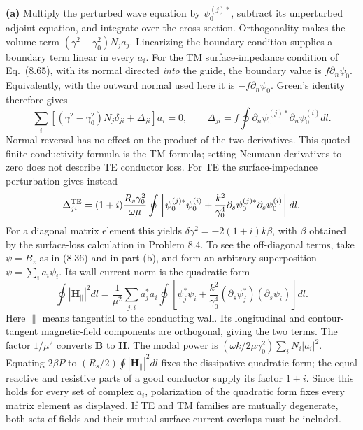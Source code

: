 \textbf{(a)} Multiply the perturbed wave equation by
$\psi_0^{(j)*}$, subtract its unperturbed adjoint equation, and
integrate over the cross section.  Orthogonality makes the volume
term $(\gamma^2-\gamma_0^2)N_ja_j$.  Linearizing the boundary
condition supplies a boundary term linear in every $a_i$.
For the TM surface-impedance condition of Eq.~(8.65), with its
normal directed \emph{into} the guide, the boundary value is
$f\partial_n\psi_0$.  Equivalently, with the outward normal used
here it is $-f\partial_n\psi_0$.  Green's identity therefore gives
\[
\sum_i[(\gamma^2-\gamma_0^2)N_j\delta_{ji}+\Delta_{ji}]a_i=0,
\qquad
\Delta_{ji}=f\oint\partial_n\psi_0^{(j)*}\partial_n\psi_0^{(i)}dl.
\]
Normal reversal has no effect on the product of the two derivatives.
This quoted finite-conductivity formula is the TM formula; setting
Neumann derivatives to zero does not describe TE conductor loss.
For TE the surface-impedance perturbation gives instead
\[
\Delta^{\rm TE}_{ji}=(1+i)\frac{R_s\gamma_0^2}{\omega\mu}
\oint\left[\psi_0^{(j)*}\psi_0^{(i)}
+\frac{k^2}{\gamma_0^4}\partial_s\psi_0^{(j)*}\partial_s\psi_0^{(i)}\right]dl.
\]
For a diagonal matrix element this yields
$\delta\gamma^2=-2(1+i)k\beta$, with $\beta$ obtained by the
surface-loss calculation in Problem 8.4.  To see the off-diagonal
terms, take $\psi=B_z$ as in (8.36) and in part (b), and form
an arbitrary superposition $\psi=\sum_i a_i\psi_i$.
Its wall-current norm is the quadratic form
\[
\oint|\mathbf H_\parallel|^2dl=
\frac1{\mu^2}\sum_{j,i}a_j^*a_i\oint\left[\psi_j^*\psi_i+
\frac{k^2}{\gamma_0^4}(\partial_s\psi_j^*)(\partial_s\psi_i)\right]dl.
\]
Here $\parallel$ means tangential to the conducting wall. Its
longitudinal and contour-tangent magnetic-field components are
orthogonal, giving the two terms. The factor $1/\mu^2$ converts
$\mathbf B$ to $\mathbf H$. The modal power is
$(\omega k/2\mu\gamma_0^2)\sum_iN_i|a_i|^2$.
Equating $2\beta P$ to $(R_s/2)\oint|\mathbf H_\parallel|^2dl$
fixes the dissipative quadratic form; the equal reactive and
resistive parts of a good conductor supply its factor $1+i$.
Since this holds for every set of complex $a_i$, polarization of
the quadratic form fixes every matrix element as displayed.
If TE and TM families are mutually degenerate, both sets of fields
and their mutual surface-current overlaps must be included.

